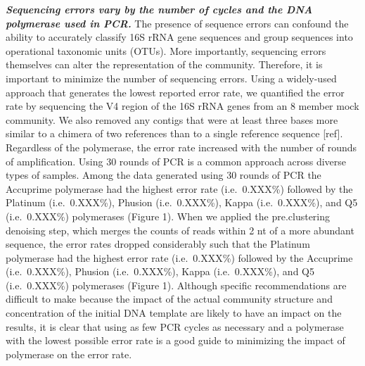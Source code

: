 \documentclass[11pt,]{article}
\begin{document}
\textbf{\emph{Sequencing errors vary by the number of cycles and the DNA
polymerase used in PCR.}} The presence of sequence errors can confound
the ability to accurately classify 16S rRNA gene sequences and group
sequences into operational taxonomic units (OTUs). More importantly,
sequencing errors themselves can alter the representation of the
community. Therefore, it is important to minimize the number of
sequencing errors. Using a widely-used approach that generates the
lowest reported error rate, we quantified the error rate by sequencing
the V4 region of the 16S rRNA genes from an 8 member mock community. We
also removed any contigs that were at least three bases more similar to
a chimera of two references than to a single reference sequence
{[}ref{]}. Regardless of the polymerase, the error rate increased with
the number of rounds of amplification. Using 30 rounds of PCR is a
common approach across diverse types of samples. Among the data
generated using 30 rounds of PCR the Accuprime polymerase had the
highest error rate (i.e.~0.XXX\%) followed by the Platinum
(i.e.~0.XXX\%), Phusion (i.e.~0.XXX\%), Kappa (i.e.~0.XXX\%), and Q5
(i.e.~0.XXX\%) polymerases (Figure 1). When we applied the
pre.clustering denoising step, which merges the counts of reads within 2
nt of a more abundant sequence, the error rates dropped considerably
such that the Platinum polymerase had the highest error rate
(i.e.~0.XXX\%) followed by the Accuprime (i.e.~0.XXX\%), Phusion
(i.e.~0.XXX\%), Kappa (i.e.~0.XXX\%), and Q5 (i.e.~0.XXX\%) polymerases
(Figure 1). Although specific recommendations are difficult to make
because the impact of the actual community structure and concentration
of the initial DNA template are likely to have an impact on the results,
it is clear that using as few PCR cycles as necessary and a polymerase
with the lowest possible error rate is a good guide to minimizing the
impact of polymerase on the error rate.
\end{document}
